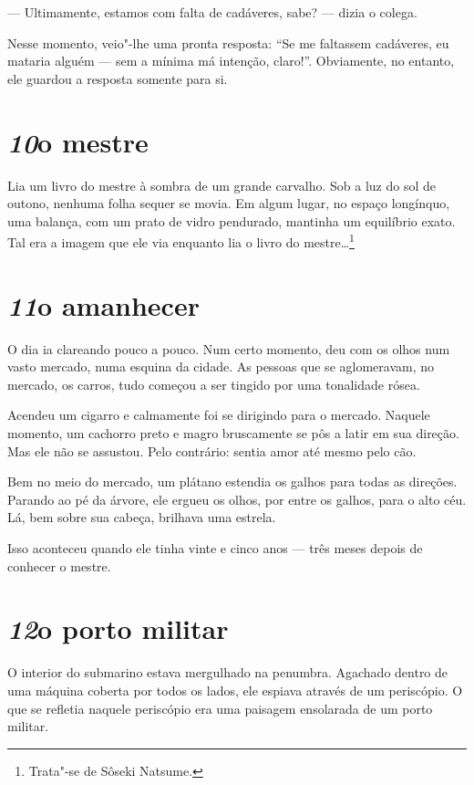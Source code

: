 --- Ultimamente, estamos com falta de cadáveres, sabe? --- dizia o colega.

Nesse momento, veio"-lhe uma pronta resposta: ``Se me faltassem cadáveres,
eu mataria alguém --- sem a mínima má intenção, claro!''. Obviamente, no
entanto, ele guardou a resposta somente para si.

\section*{\textit{10}\es o mestre}

Lia um livro do mestre à sombra de um grande carvalho. Sob a luz do sol 
de outono, nenhuma folha sequer se movia. Em algum lugar, no espaço
longínquo, uma balança, com um prato de vidro pendurado, mantinha um
equilíbrio exato. Tal era a imagem que ele via enquanto lia o livro do
mestre\ldots{}\footnote{ Trata"-se de Sôseki Natsume.}

\section*{\textit{11}\es o amanhecer}

O dia ia clareando pouco a pouco. Num certo momento, deu com os olhos
num vasto mercado, numa esquina da cidade. As pessoas que se
aglomeravam, no mercado, os carros, tudo começou a ser tingido por uma
tonalidade rósea.

Acendeu um cigarro e calmamente foi se dirigindo para o mercado. Naquele
momento, um cachorro preto e magro bruscamente se pôs a latir em sua
direção. Mas ele não se assustou. Pelo contrário: sentia amor até mesmo
pelo cão.

Bem no meio do mercado, um plátano estendia os galhos para todas as
direções. Parando ao pé da árvore, ele ergueu os olhos, por entre os
galhos, para o alto céu. Lá, bem sobre sua cabeça, brilhava uma
estrela.

Isso aconteceu quando ele tinha vinte e cinco anos --- três meses depois
de conhecer o mestre.

\section*{\textit{12}\es o porto militar}

O interior do submarino estava mergulhado na penumbra. Agachado dentro
de uma máquina coberta por todos os lados, ele espiava através de um
periscópio. O que se refletia naquele periscópio era uma paisagem
ensolarada de um porto militar.

